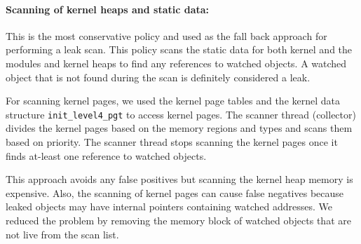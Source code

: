 




\paragraph{Scanning of kernel heaps and static data:} This is the most conservative policy and used as the fall back approach for performing a leak scan. This policy scans the static data for both kernel and the modules and kernel heaps to find any references to watched objects. A watched object that is not found during the scan is definitely considered a leak.

For scanning kernel pages, we used the kernel page tables and the kernel data structure \texttt{init\_level4\_pgt} to access kernel pages. The scanner thread (collector) divides the kernel pages based on the memory regions and types and scans them based on priority. The scanner thread stops scanning the kernel pages once it finds at-least one reference to watched objects.

This approach avoids any false positives but scanning the kernel heap memory is expensive. Also, the scanning of kernel pages can cause false negatives because leaked objects may have internal pointers containing watched addresses. We reduced the problem by removing the memory block of watched objects that are not live from the scan list.






